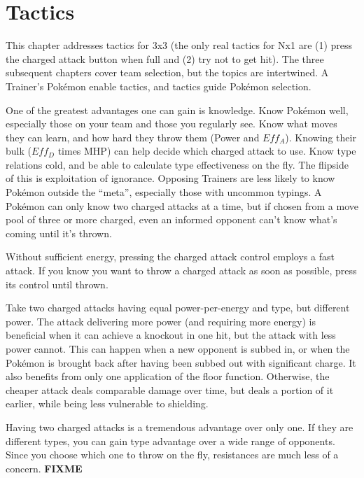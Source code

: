 \chapter{Tactics}
\label{chap:strategy}
This chapter addresses tactics for 3x3 (the only real tactics for Nx1 are (1)
  press the charged attack button when full and (2) try not to get hit).
The three subsequent chapters cover team selection, but the topics are intertwined.
A Trainer's Pokémon enable tactics, and tactics guide Pokémon selection.

One of the greatest advantages one can gain is knowledge.
Know Pokémon well, especially those on your team and those you regularly see.
Know what moves they can learn, and how hard they throw them (Power and $Eff_A$).
Knowing their bulk ($Eff_D$ times MHP) can help decide which charged attack to use.
Know type relations cold, and be able to calculate type effectiveness on the fly.
The flipside of this is exploitation of ignorance.
Opposing Trainers are less likely to know Pokémon outside the ``meta'',
 especially those with uncommon typings.
A Pokémon can only know two charged attacks at a time, but if
 chosen from a move pool of three or more charged, even an informed opponent
 can't know what's coming until it's thrown.

\begin{tipbox}[title=A tip regarding battle UI]
Without sufficient energy, pressing the charged attack control employs a fast attack.
If you know you want to throw a charged attack as soon as possible, press its control until thrown.
\end{tipbox}

Take two charged attacks having equal power-per-energy and type, but different power.
The attack delivering more power (and requiring more energy) is beneficial
 when it can achieve a knockout in one hit, but the attack with less power cannot.
This can happen when a new opponent is subbed in, or when the Pokémon is brought back
 after having been subbed out with significant charge.
It also benefits from only one application of the floor function.
Otherwise, the cheaper attack deals comparable damage over time, but deals a portion
 of it earlier, while being less vulnerable to shielding.

Having two charged attacks is a tremendous advantage over only one.
If they are different types, you can gain type advantage over a wide range of opponents.
Since you choose which one to throw on the fly, resistances are much less of a concern.
\textbf{FIXME}


